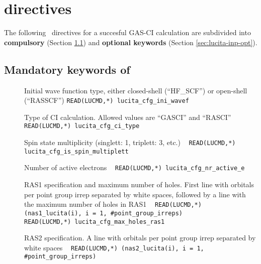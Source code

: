 \section{ directives}\label{sec:lucita-inp}

          The following \ directives for a succesful GAS-CI calculation 
are subdivided into {\bf{compulsory}} (Section \ref{sec:lucita-inp-mand}) 
and {\bf{optional keywords}} (Section \ref{sec:lucita-inp-opt}). 

\subsection{Mandatory keywords of }\label{sec:lucita-inp-mand}

\begin{description}
\item[] Initial wave function type, either closed-shell (``HF\_SCF'') or open-shell (``RASSCF'') 
\verb|READ(LUCMD,*) lucita_cfg_ini_wavef |

\item[] Type of CI calculation. Allowed values are ``GASCI'' and ``RASCI'' \verb| |\newline
\verb|READ(LUCMD,*) lucita_cfg_ci_type |

\item[] Spin state multiplicity (singlett: 1, triplett: 3, etc.) \verb| |\newline
\verb|READ(LUCMD,*) lucita_cfg_is_spin_multiplett |


\vspace{0.75cm}


\item[] Number of active electrons \verb| |\newline
\verb|READ(LUCMD,*) lucita_cfg_nr_active_e |

\item[] RAS1 specification and maximum number of holes. 
First line with orbitals per point group irrep separated by white spaces, 
followed by a line with the maximum number of holes in RAS1 \verb| |\newline
\verb|READ(LUCMD,*) (nas1_lucita(i), i = 1, #point_group_irreps) |\\
\verb|READ(LUCMD,*) lucita_cfg_max_holes_ras1 |

\item[] RAS2 specification. A line with orbitals per point group irrep separated by white spaces \verb| |\newline
\verb|READ(LUCMD,*) (nas2_lucita(i), i = 1, #point_group_irreps) |


\end{description}
